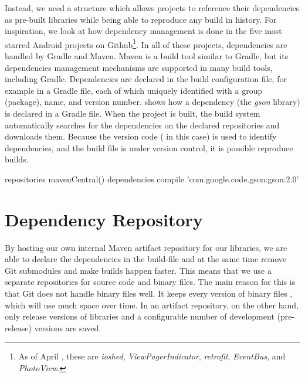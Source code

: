 Instead, we need a structure which allows projects to reference their dependencies as pre-built libraries while being able to reproduce any build in history. For inspiration, we look at how dependency management is done in the five most starred Android projects on Github\footnote{As of April , these are \emph{ioshed}, \emph{ViewPagerIndicator}, \emph{retrofit}, \emph{EventBus}, and \emph{PhotoView}.}. In all of these projects, dependencies are handled by Gradle and Maven. Maven is a build tool similar to Gradle, but its dependencies management mechanisms are supported in many build tools, including Gradle. Dependencies are declared in the build configuration file, for example in a Gradle file, each of which uniquely identified with a group (package), name, and version number.  shows how a dependency (the \emph{gson} library) is declared in a Gradle file. When the project is built, the build system automatically searches for the dependencies on the declared repositories and downloads them. Because the version code ( in this case) is used to identify dependencies, and the build file is under version control, it is possible reproduce builds.

\begin{gradlecode}[caption={Dependency declaration in Gradle},label={lst:dependency_declaration}]
repositories {
  mavenCentral()
}
dependencies {
  compile 'com.google.code.gson:gson:2.0'
}
\end{gradlecode}

\section{Dependency Repository}\label{sec:dependency_repository}
By hosting our own internal Maven artifact repository for our libraries, we are able to declare the dependencies in the build-file and at the same time remove Git submodules and make builds happen faster. This means that we use a separate repositories for source code and binary files. The main reason for this is that Git does not handle binary files well. It keeps every version of binary files \parencite{gitwebsite_attributes}, which will use much space over time. In an artifact repository, on the other hand, only release versions of libraries and a configurable number of development (pre-release) versions are saved.

